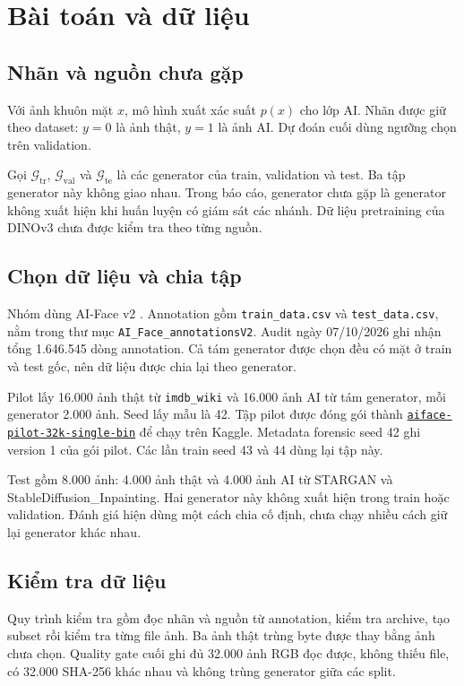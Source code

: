 \section{Bài toán và dữ liệu}
\subsection{Nhãn và nguồn chưa gặp}
Với ảnh khuôn mặt $x$, mô hình xuất xác suất $p(x)$ cho lớp AI. Nhãn được giữ theo dataset: $y=0$ là ảnh thật, $y=1$ là ảnh AI. Dự đoán cuối dùng ngưỡng chọn trên validation.

Gọi $\mathcal G_{\mathrm{tr}}$, $\mathcal G_{\mathrm{val}}$ và $\mathcal G_{\mathrm{te}}$ là các generator của train, validation và test. Ba tập generator này không giao nhau. Trong báo cáo, generator chưa gặp là generator không xuất hiện khi huấn luyện có giám sát các nhánh. Dữ liệu pretraining của DINOv3 chưa được kiểm tra theo từng nguồn.

\subsection{Chọn dữ liệu và chia tập}
Nhóm dùng AI-Face v2 \cite{Lin_2025_CVPR}. Annotation gồm \texttt{train\_data.csv} và \texttt{test\_data.csv}, nằm trong thư mục \nolinkurl{AI_Face_annotationsV2}. Audit ngày 07/10/2026 ghi nhận tổng 1.646.545 dòng annotation. Cả tám generator được chọn đều có mặt ở train và test gốc, nên dữ liệu được chia lại theo generator.

Pilot lấy 16.000 ảnh thật từ \texttt{imdb\_wiki} và 16.000 ảnh AI từ tám generator, mỗi generator 2.000 ảnh. Seed lấy mẫu là 42. Tập pilot được đóng gói thành \href{https://www.kaggle.com/datasets/nguyentrann0703/aiface-pilot-32k-single-bin}{\texttt{aiface-pilot-32k-single-bin}} để chạy trên Kaggle. Metadata forensic seed 42 ghi version 1 của gói pilot. Các lần train seed 43 và 44 dùng lại tập này.

\begin{table}[H]
\centering
\caption{Cách chia tập pilot. Mỗi generator AI có 2.000 ảnh.}
\label{tab:dataset-split}

\end{table}

Test gồm 8.000 ảnh: 4.000 ảnh thật và 4.000 ảnh AI từ STARGAN và StableDiffusion\_\allowbreak Inpainting. Hai generator này không xuất hiện trong train hoặc validation. Đánh giá hiện dùng một cách chia cố định, chưa chạy nhiều cách giữ lại generator khác nhau.

\subsection{Kiểm tra dữ liệu}
Quy trình kiểm tra gồm đọc nhãn và nguồn từ annotation, kiểm tra archive, tạo subset rồi kiểm tra từng file ảnh. Ba ảnh thật trùng byte được thay bằng ảnh chưa chọn. Quality gate cuối ghi đủ 32.000 ảnh RGB đọc được, không thiếu file, có 32.000 SHA-256 khác nhau và không trùng generator giữa các split.

